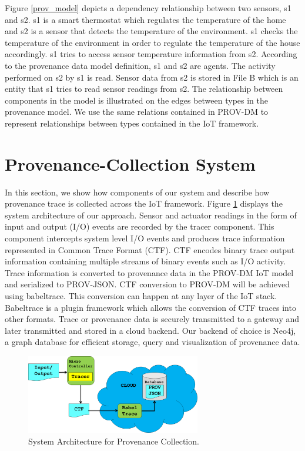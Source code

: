 Figure \ref{prov_model}  depicts a dependency relationship between two sensors, s1 and s2. s1 is a smart thermostat which regulates the temperature of the home and s2 is a sensor that detects the temperature of the environment. s1 checks the temperature of the environment in order to regulate the temperature of the house accordingly. s1 tries to access sensor temperature information from s2. According to the provenance data model  definition, s1 and s2 are agents. The activity performed on s2 by s1 is read. Sensor data from s2 is stored in File B which is  an entity that s1 tries to read sensor readings from s2. The relationship between components in the model is illustrated on the edges between types in the provenance model. We use the same relations contained in PROV-DM to represent relationships between types contained in the IoT framework.




\section{Provenance-Collection System}

In this section, we show how components of our system and describe how provenance trace is collected across the IoT framework. Figure \ref{architecture} displays the system architecture of our approach. Sensor and actuator readings in the form of input and output (I/O) events are recorded by the tracer component. This component intercepts system level I/O events and produces trace information represented in Common Trace Format (CTF). CTF encodes binary trace output information containing multiple streams of binary events such as I/O activity. Trace information is converted to provenance data in the PROV-DM IoT model and serialized to PROV-JSON. CTF conversion to PROV-DM will be achieved using babeltrace. This conversion can happen at any layer of the IoT stack. Babeltrace is a plugin framework which allows the conversion of CTF traces into other formats. Trace or provenance data is securely transmitted to a gateway and later transmitted and stored in a cloud backend. Our backend of choice is Neo4j, a graph database for efficient storage, query and visualization of provenance data.


\begin{figure}[b]
\begin{center}

\includegraphics[width =3.0in]{system_architecture.PNG}    
\end{center}
\caption{System Architecture for Provenance Collection.}
\label{architecture}
\end{figure}


